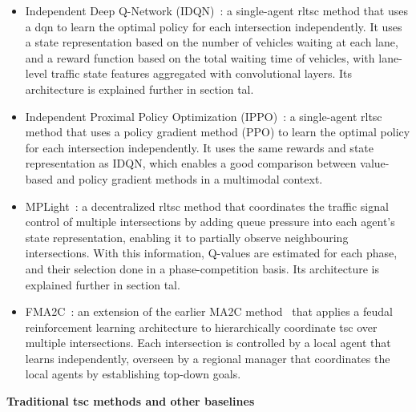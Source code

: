 \begin{itemize}
    \item Independent Deep Q-Network (IDQN)~\cite{Ault2019}: a single-agent \gls{rltsc} method that uses a \gls{dqn} to learn the optimal policy for each intersection independently. It uses a state representation based on the number of vehicles waiting at each lane, and a reward function based on the total waiting time of vehicles, with lane-level traffic state features aggregated with convolutional layers. Its architecture is explained further in section tal.
    \item Independent Proximal Policy Optimization (IPPO)~\cite{Ault2019}: a single-agent \gls{rltsc} method that uses a policy gradient method (PPO) to learn the optimal policy for each intersection independently. It uses the same rewards and state representation as IDQN, which enables a good comparison between value-based and policy gradient methods in a multimodal context.
    \item MPLight~\cite{Chen2020}: a decentralized \gls{rltsc} method that coordinates the traffic signal control of multiple intersections by adding queue pressure into each agent's state representation, enabling it to partially observe neighbouring intersections. With this information, Q-values are estimated for each phase, and their selection done in a phase-competition basis. Its architecture is explained further in section tal.
    \item FMA2C~\cite{Ma2020}: an extension of the earlier MA2C method~\cite{Chu2019} that applies a feudal reinforcement learning architecture to hierarchically coordinate \gls{tsc} over multiple intersections. Each intersection is controlled by a local agent that learns independently, overseen by a regional manager that coordinates the local agents by establishing top-down goals.
\end{itemize}

\noindent \textbf{Traditional \gls{tsc} methods and other baselines}

